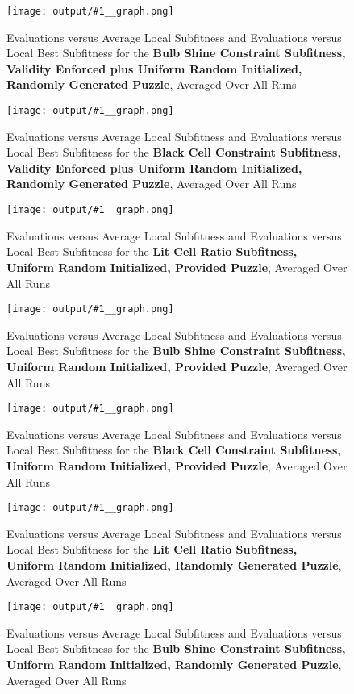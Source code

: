\documentclass[11pt]{article}
\newcommand{\fitnessplotcaption}[1]{\caption{Evaluations versus Average Local Subfitness and Evaluations versus 
    Local Best Subfitness for the \textbf{{#1}}, Averaged Over All Runs}}
\newcommand{\addgraphic}[1]{\centerline{\texttt{[image: output/\#1\_\_graph.png]}}}
\begin{document}
\begin{figure}
    \addgraphic{random_gen/random_gen_bulb_shine_constr}
    \fitnessplotcaption{Bulb Shine Constraint Subfitness, Validity Enforced plus Uniform Random Initialized, Randomly Generated Puzzle}
    \label{fig:random_gen_v_shine}
\end{figure}

\begin{figure}
    \addgraphic{random_gen/random_gen_black_cell_constr}
    \fitnessplotcaption{Black Cell Constraint Subfitness, Validity Enforced plus Uniform Random Initialized, Randomly Generated Puzzle}
    \label{fig:random_gen_v_black}
\end{figure}



\begin{figure}
    \addgraphic{website_puzzle/website_puzzle_uniform_random_init_lit_cell_ratio}
    \fitnessplotcaption{Lit Cell Ratio Subfitness, Uniform Random Initialized, Provided Puzzle}
    \label{fig:website_u_ratio}
\end{figure}

\begin{figure}
    \addgraphic{website_puzzle/website_puzzle_uniform_random_init_bulb_shine_constr}
    \fitnessplotcaption{Bulb Shine Constraint Subfitness, Uniform Random Initialized, Provided Puzzle}
    \label{fig:website_u_shine}
\end{figure}

\begin{figure}
    \addgraphic{website_puzzle/website_puzzle_uniform_random_init_black_cell_constr}
    \fitnessplotcaption{Black Cell Constraint Subfitness, Uniform Random Initialized, Provided Puzzle}
    \label{fig:website_u_black}
\end{figure}

\begin{figure}
    \addgraphic{random_gen/random_gen_uniform_random_init_lit_cell_ratio}
    \fitnessplotcaption{Lit Cell Ratio Subfitness, Uniform Random Initialized, Randomly Generated Puzzle}
    \label{fig:random_gen_u_ratio}
\end{figure}

\begin{figure}
    \addgraphic{random_gen/random_gen_uniform_random_init_bulb_shine_constr}
    \fitnessplotcaption{Bulb Shine Constraint Subfitness, Uniform Random Initialized, Randomly Generated Puzzle}
    \label{fig:random_gen_u_shine}
\end{figure}
\end{document}
